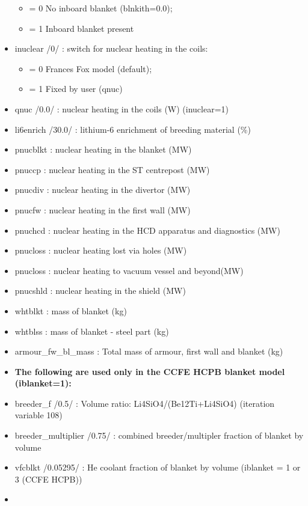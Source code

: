 \documentclass[]{article}
\providecommand{\tightlist}{%
  \setlength{\itemsep}{0pt}\setlength{\parskip}{0pt}}
\begin{document}
\begin{itemize}
  \begin{itemize}
  \tightlist
  \item
    = 0 No inboard blanket (blnkith=0.0);
  \item
    = 1 Inboard blanket present
  \end{itemize}
\item
  inuclear /0/ : switch for nuclear heating in the coils:

  \begin{itemize}
  \tightlist
  \item
    = 0 Frances Fox model (default);
  \item
    = 1 Fixed by user (qnuc)
  \end{itemize}
\item
  qnuc /0.0/ : nuclear heating in the coils (W) (inuclear=1)
\item
  li6enrich /30.0/ : lithium-6 enrichment of breeding material (\%)
\item
  pnucblkt : nuclear heating in the blanket (MW)
\item
  pnuccp : nuclear heating in the ST centrepost (MW)
\item
  pnucdiv : nuclear heating in the divertor (MW)
\item
  pnucfw : nuclear heating in the first wall (MW)
\item
  pnuchcd : nuclear heating in the HCD apparatus and diagnostics (MW)
\item
  pnucloss : nuclear heating lost via holes (MW)
\item
  pnucloss : nuclear heating to vacuum vessel and beyond(MW)
\item
  pnucshld : nuclear heating in the shield (MW)
\item
  whtblkt : mass of blanket (kg)
\item
  whtblss : mass of blanket - steel part (kg)
\item
  armour\_fw\_bl\_mass : Total mass of armour, first wall and blanket
  (kg)
\item
  \textbf{The following are used only in the CCFE HCPB blanket model
  (iblanket=1):}
\item
  breeder\_f /0.5/ : Volume ratio: Li4SiO4/(Be12Ti+Li4SiO4) (iteration
  variable 108)
\item
  breeder\_multiplier /0.75/ : combined breeder/multipler fraction of
  blanket by volume
\item
  vfcblkt /0.05295/ : He coolant fraction of blanket by volume (iblanket
  = 1 or 3 (CCFE HCPB))
\item

\end{itemize}
\end{document}
